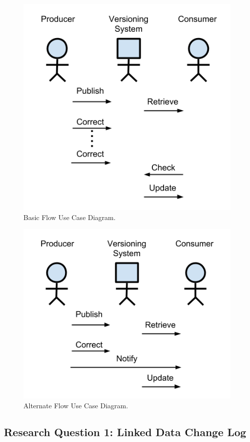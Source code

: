 \begin{figure}
	\centering
	\includegraphics[scale=1]{figures/UC_Diagram1.png}
	\caption{Basic Flow Use Case Diagram.}
	\label{UCD1}
\end{figure}

\begin{figure}
	\centering
	\includegraphics[scale=1]{figures/UC_Diagram2.png}
	\caption{Alternate Flow Use Case Diagram.}
	\label{UCD2}
\end{figure}
\subsection{Research Question 1: Linked Data Change Log}

